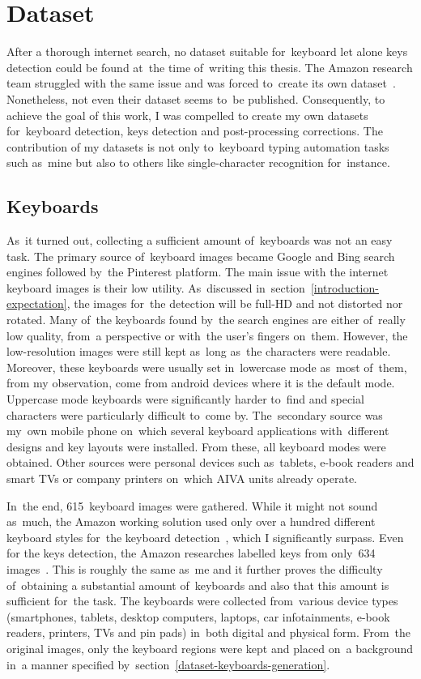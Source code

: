 \chapter{Dataset}
\label{dataset}
After a thorough internet search, no dataset suitable for~keyboard let alone keys detection could be found at~the time of~writing this thesis. The Amazon research team struggled with the same issue and was forced to~create its own dataset~\cite{amazon-paper}. Nonetheless, not even their dataset seems to~be published. Consequently, to achieve the goal of this work, I was compelled to create my own datasets for~keyboard detection, keys detection and post-processing corrections. The contribution of my datasets is not only to~keyboard typing automation tasks such as~mine but also to others like single-character recognition for~instance.

\section{Keyboards}
\label{dataset-keyboards}
As~it turned out, collecting a sufficient amount of~keyboards was not an easy task. The primary source of~keyboard images became Google and Bing search engines followed by~the Pinterest platform. The main issue with the internet keyboard images is their low utility. As~discussed in~section~\ref{introduction-expectation}, the images for~the detection will be \hbox{full-HD} and not distorted nor rotated. Many of~the keyboards found by~the search engines are either of~really low quality, from~a perspective or with~the user's fingers on~them. However, the low-resolution images were still kept as~long as~the characters were readable. Moreover, these keyboards were usually set in~lowercase mode as~most of~them, from my observation, come from android devices where it is the default mode. Uppercase mode keyboards were significantly harder to~find and special characters were particularly difficult to~come by. The~secondary source was my~own mobile phone on~which several keyboard applications with~different designs and key layouts were installed. From these, all keyboard modes were obtained. Other sources were personal devices such as~tablets, e-book readers and smart TVs or company printers on~which AIVA units already operate.

In~the end, 615~keyboard images were gathered. While it might not sound as~much, the Amazon working solution used only over a hundred different keyboard styles for~the keyboard detection~\cite{amazon-paper}, which I significantly surpass. Even for the keys detection, the Amazon researches labelled keys from only~634 images~\cite{amazon-paper}. This is roughly the same as~me and it further proves the difficulty of~obtaining a substantial amount of~keyboards and also that this amount is sufficient for~the task. The keyboards were collected from~various device types (smartphones, tablets, desktop computers, laptops, car infotainments, e-book readers, printers, TVs and pin pads) in~both digital and physical form. From~the original images, only the keyboard regions were kept and placed on~a background in~a manner specified by~section~\ref{dataset-keyboards-generation}. 

